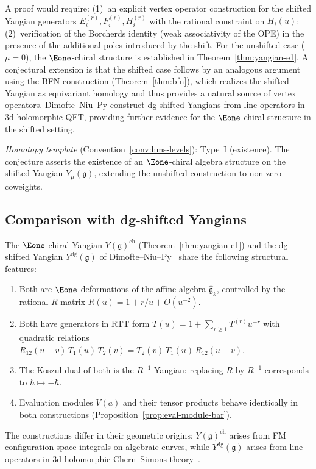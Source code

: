 \begin{remark}[Scope]
A proof would require: (1)~an explicit vertex operator construction for
the shifted Yangian generators $E_i^{(r)}, F_i^{(r)}, H_i^{(r)}$ with
the rational constraint on $H_i(u)$; (2)~verification of the Borcherds
identity (weak associativity of the OPE) in the presence of the additional
poles introduced by the shift.  For the unshifted case ($\mu = 0$), the
$\Eone$-chiral structure is established in Theorem~\ref{thm:yangian-e1}.
A conjectural extension is that the shifted case follows by an analogous argument using the
BFN construction (Theorem~\ref{thm:bfn}), which realizes the shifted
Yangian as equivariant homology and thus provides a natural source of
vertex operators.  Dimofte--Niu--Py \cite{DNP25} construct dg-shifted Yangians
from line operators in 3d holomorphic QFT, providing further evidence for the
$\Eone$-chiral structure in the shifted setting.

\emph{Homotopy template} (Convention~\ref{conv:hms-levels}): Type~I (existence).
The conjecture asserts the existence of an $\Eone$-chiral algebra structure on the shifted Yangian $Y_\mu(\mathfrak{g})$, extending the unshifted construction to non-zero coweights.
\end{remark}

\subsection{Comparison with dg-shifted Yangians}
\label{sec:dg-shifted-comparison}

\begin{proposition}
\label{prop:dg-shifted-comparison}
The $\Eone$-chiral Yangian
$Y(\mathfrak{g})^{\mathrm{ch}}$
\textup{(}Theorem~\textup{\ref{thm:yangian-e1})}
and the dg-shifted Yangian
$Y^{\mathrm{dg}}(\mathfrak{g})$
of Dimofte--Niu--Py~\textup{\cite{DNP25}}
share the following structural features:
\begin{enumerate}[label=\textup{(\roman*)}]
\item Both are $\Eone$-deformations of the affine algebra
  $\widehat{\mathfrak{g}}_k$, controlled by the rational
  $R$-matrix $R(u) = 1 + r/u + O(u^{-2})$.
\item Both have generators in RTT form
  $T(u) = 1 + \sum_{r \geq 1} T^{(r)} u^{-r}$
  with quadratic relations
  $R_{12}(u{-}v)\,T_1(u)\,T_2(v) = T_2(v)\,T_1(u)\,R_{12}(u{-}v)$.
\item The Koszul dual of both is the $R^{-1}$-Yangian:
  replacing $R$ by $R^{-1}$ corresponds to
  $\hbar \mapsto -\hbar$.
\item Evaluation modules $V(a)$ and their tensor products
  behave identically in both constructions
  (Proposition~\ref{prop:eval-module-bar}).
\end{enumerate}
The constructions differ in their geometric origins:
$Y(\mathfrak{g})^{\mathrm{ch}}$ arises from FM configuration
space integrals on algebraic curves, while
$Y^{\mathrm{dg}}(\mathfrak{g})$ arises from line operators
in 3d holomorphic Chern--Simons theory~\textup{\cite{DNP25}}.
\end{proposition}

